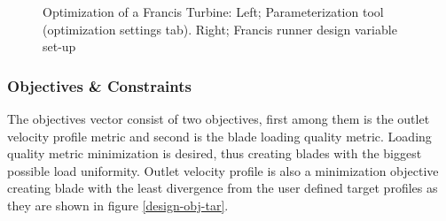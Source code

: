 \begin{figure}[h!]
\begin{minipage}[b]{0.5\linewidth}
 \centering
\end{minipage}
\begin{minipage}[b]{0.5\linewidth}
 \centering
\end{minipage}
\caption{Optimization of a Francis Turbine: Left; Parameterization tool (optimization settings tab). Right; Francis runner design variable set-up}
\label{design-parameterization2}
\end{figure}

\subsubsection{Objectives \& Constraints}
The objectives vector consist of two objectives, first among them is the outlet velocity profile metric and second is the blade loading quality metric. Loading quality metric minimization is desired, thus creating blades with the biggest possible load uniformity. Outlet velocity profile is also a minimization objective creating blade with the least divergence from the user defined target profiles as they are shown in figure \ref{design-obj-tar}. 

